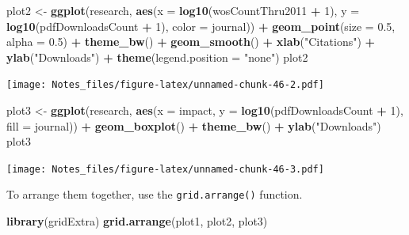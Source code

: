 \documentclass[
]{book}
\newenvironment{Shaded}{\begin{snugshade}}{\end{snugshade}}
\newcommand{\DataTypeTok}[1]{\textcolor[rgb]{0.13,0.29,0.53}{#1}}
\newcommand{\DecValTok}[1]{\textcolor[rgb]{0.00,0.00,0.81}{#1}}
\newcommand{\FloatTok}[1]{\textcolor[rgb]{0.00,0.00,0.81}{#1}}
\newcommand{\KeywordTok}[1]{\textcolor[rgb]{0.13,0.29,0.53}{\textbf{#1}}}
\newcommand{\NormalTok}[1]{#1}
\newcommand{\OperatorTok}[1]{\textcolor[rgb]{0.81,0.36,0.00}{\textbf{#1}}}
\newcommand{\StringTok}[1]{\textcolor[rgb]{0.31,0.60,0.02}{#1}}
\begin{document}
\begin{Shaded}
\begin{Highlighting}[]
\NormalTok{plot2 <-}\StringTok{ }\KeywordTok{ggplot}\NormalTok{(research, }\KeywordTok{aes}\NormalTok{(}\DataTypeTok{x =} \KeywordTok{log10}\NormalTok{(wosCountThru2011 }\OperatorTok{+}\StringTok{ }\DecValTok{1}\NormalTok{),}
                              \DataTypeTok{y =} \KeywordTok{log10}\NormalTok{(pdfDownloadsCount }\OperatorTok{+}\StringTok{ }\DecValTok{1}\NormalTok{),}
                              \DataTypeTok{color =}\NormalTok{ journal)) }\OperatorTok{+}
\StringTok{    }\KeywordTok{geom_point}\NormalTok{(}\DataTypeTok{size =} \FloatTok{0.5}\NormalTok{, }\DataTypeTok{alpha =} \FloatTok{0.5}\NormalTok{) }\OperatorTok{+}
\StringTok{    }\KeywordTok{theme_bw}\NormalTok{() }\OperatorTok{+}
\StringTok{    }\KeywordTok{geom_smooth}\NormalTok{() }\OperatorTok{+}
\StringTok{  }\KeywordTok{xlab}\NormalTok{(}\StringTok{"Citations"}\NormalTok{) }\OperatorTok{+}
\StringTok{  }\KeywordTok{ylab}\NormalTok{(}\StringTok{"Downloads"}\NormalTok{) }\OperatorTok{+}
\StringTok{  }\KeywordTok{theme}\NormalTok{(}\DataTypeTok{legend.position =} \StringTok{"none"}\NormalTok{)}
\NormalTok{plot2}
\end{Highlighting}
\end{Shaded}

\texttt{[image: Notes\_files/figure-latex/unnamed-chunk-46-2.pdf]}

\begin{Shaded}
\begin{Highlighting}[]
\NormalTok{plot3 <-}\StringTok{ }\KeywordTok{ggplot}\NormalTok{(research, }\KeywordTok{aes}\NormalTok{(}\DataTypeTok{x =}\NormalTok{ impact,}
                              \DataTypeTok{y =} \KeywordTok{log10}\NormalTok{(pdfDownloadsCount }\OperatorTok{+}\StringTok{ }\DecValTok{1}\NormalTok{),}
                              \DataTypeTok{fill =}\NormalTok{ journal)) }\OperatorTok{+}
\StringTok{    }\KeywordTok{geom_boxplot}\NormalTok{() }\OperatorTok{+}\StringTok{ }
\StringTok{    }\KeywordTok{theme_bw}\NormalTok{() }\OperatorTok{+}
\StringTok{  }\KeywordTok{ylab}\NormalTok{(}\StringTok{"Downloads"}\NormalTok{)}
\NormalTok{plot3}
\end{Highlighting}
\end{Shaded}

\texttt{[image: Notes\_files/figure-latex/unnamed-chunk-46-3.pdf]}

To arrange them together, use the \texttt{grid.arrange()} function.

\begin{Shaded}
\begin{Highlighting}[]
\KeywordTok{library}\NormalTok{(gridExtra)}
\KeywordTok{grid.arrange}\NormalTok{(plot1, plot2, plot3)}
\end{Highlighting}
\end{Shaded}
\end{document}
